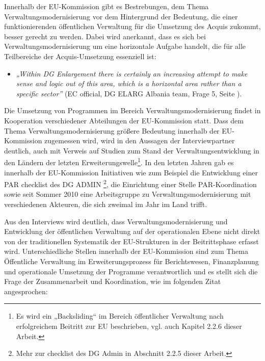 Innerhalb der EU-Kommission gibt es Bestrebungen, dem Thema Verwaltungsmodernisierung vor dem Hintergrund der Bedeutung, die einer funktionierenden öffentlichen Verwaltung für die Umsetzung des Acquis zukommt, besser gerecht zu werden. Dabei wird anerkannt, dass es sich bei Verwaltungsmodernisierung um eine horizontale Aufgabe handelt, die für alle Teilbereiche der Acquis-Umsetzung essenziell ist:
\begin{itemize}[label={}]
\item \textit{„Within DG Enlargement there is certainly an increasing attempt to make sense and logic out of this area, which is a horizontal area rather than a specific sector”} (EC official, DG ELARG Albania team, Frage 5, Seite \pageref{sec:admin}).
\end{itemize}
Die Umsetzung von Programmen im Bereich Verwaltungsmodernisierung findet in Kooperation verschiedener Abteilungen der EU-Kommission statt. Dass dem Thema Verwaltungsmodernisierung größere Bedeutung innerhalb der EU-Kommission zugemessen wird, wird in den Aussagen der Interviewpartner deutlich, auch mit Verweis auf Studien zum Stand der Verwaltungsentwicklung in den Ländern der letzten Erweiterungswelle\footnote{Es wird ein „Backsliding“ im Bereich öffentlicher Verwaltung nach erfolgreichem Beitritt zur EU beschrieben, vgl. auch Kapitel 2.2.6 dieser Arbeit.}. In den letzten Jahren gab es innerhalb der EU-Kommission Initiativen wie zum Beispiel die Entwicklung einer PAR checklist des DG ADMIN \footnote{Mehr zur checklist des DG Admin in Abschnitt 2.2.5 dieser Arbeit.}, die Einrichtung einer Stelle PAR-Koordination sowie seit Sommer 2010 eine Arbeitsgruppe zu Verwaltungsmodernisierung mit verschiedenen Akteuren, die sich zweimal im Jahr im Land trifft.\par
Aus den Interviews wird deutlich, dass Verwaltungsmodernisierung und Entwicklung der öffentlichen Verwaltung auf der operationalen Ebene nicht direkt von der traditionellen Systematik der EU-Strukturen in der Beitrittsphase erfasst wird. Unterschiedliche Stellen innerhalb der EU-Kommission sind zum Thema Öffentliche Verwaltung im Erweiterungsprozess für Berichtswesen, Finanzplanung und operationale Umsetzung der Programme verantwortlich und es stellt sich die Frage der Zusammenarbeit und Koordination, wie im folgenden Zitat angesprochen:
